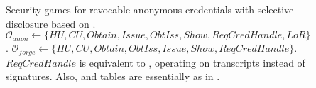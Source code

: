 \begin{figure}[ht!]
  \centering
  \caption{Security games for revocable anonymous credentials with selective
    disclosure based on \cite{fhs19}. 
    $\mathcal{O}_{anon} \gets \lbrace HU,CU,Obtain,Issue,ObtIss,Show,
    ReqCredHandle,LoR\rbrace$. $\mathcal{O}_{forge} \gets \lbrace HU,CU,
    Obtain,ObtIss,Issue,Show,ReqCredHandle \rbrace$. $ReqCredHandle$ is
    equivalent to \OPEN, operating on transcripts \utrans instead of signatures.
    Also, \OWNR and \ATTR tables are essentially as in .}
  \label{fig:model-rac}  
\end{figure}

